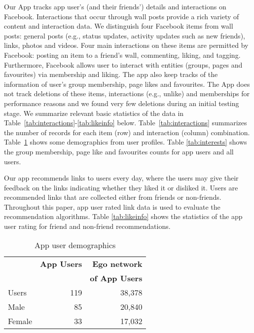 Our App tracks app user's (and their friends') details and
interactions on Facebook.  Interactions that occur through wall posts
provide a rich variety of content and interaction data.  We
distinguish four Facebook items from wall posts: general posts (e.g.,
status updates, activity updates such as new friends), links, photos
and videos. Four main interactions on these items are permitted by
Facebook: posting an item to a friend's wall, commenting, liking, and
tagging. Furthermore, Facebook allows user to interact with entities
(groups, pages and favourites) via membership and liking. The app also
keep tracks of the information of user's group membership, page likes
and favourites.  The App does not track deletions of these items,
interactions (e.g., unlike) and memberships for performance reasons
and we found very few deletions during an initial testing stage.  We
summarize relevant basic statistics of the data in
Table~\ref{tab:interactions}-\ref{tab:likeinfo} below.
Table~\ref{tab:interactions} summarizes the number of records for each
item (row) and interaction (column)
combination. Table~\ref{tab:demographics} shows some demographics from
user profiles. Table \ref{tab:interests} shows the group membership,
page like and favourites counts for app users and all users.

Our app recommends links to users every day, where the users may give
their feedback on the links indicating whether they liked it or
disliked it. Users are recommended links that are collected either
from friends or non-friends. Throughout this paper, app user rated
link data is used to evaluate the recommendation algorithms.
Table \ref{tab:likeinfo} shows the statistics of the app user rating
for friend and non-friend recommendations.
      							
\begin{table}
\centering
\begin{tabular}{|>{\small}l|>{\small}r|>{\small}r|}
\hline
& \textbf{App Users} & \textbf{Ego network} \\
& & \textbf{of App Users} \\
\hline
Users & 119 & 38,378 \\
\hline
Male & 85 & 20,840 \\
\hline
Female & 33 & 17,032 \\
\hline
\end{tabular}
\caption{App user demographics}
\label{tab:demographics}
\end{table}

